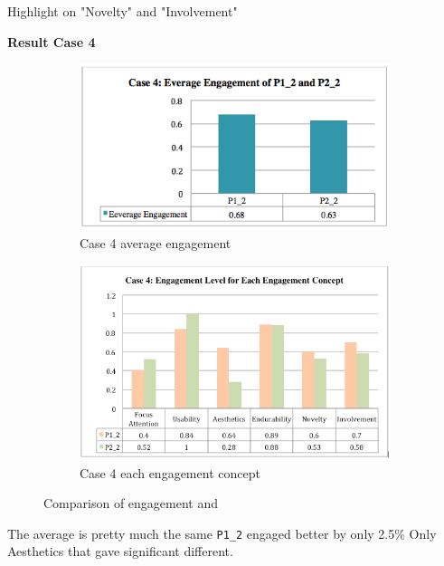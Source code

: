Highlight on "Novelty" and "Involvement" 


\textbf{Result Case 4} 
\begin{figure}[!hbt]\centering
    \begin{subfigure}{0.7\textwidth}
 \includegraphics[width=\textwidth]{case4a}
 \caption{Case 4 average engagement}
    \end{subfigure}\hspace{0.1\textwidth}
    \begin{subfigure}{1.0\textwidth}
\includegraphics[width=\textwidth]{case4b}
  \caption{Case 4 each engagement concept}
    \end{subfigure}
    \caption{Comparison of engagement   and }
\end{figure}

The average is pretty much the same \verb|P1_2| engaged better by only 2.5\% 
Only Aesthetics that gave significant different. 


